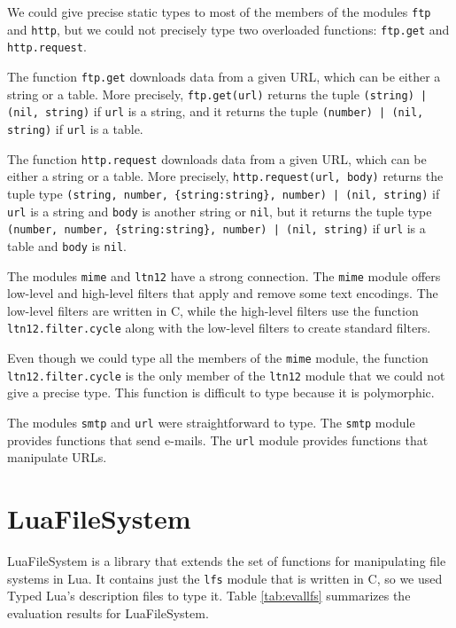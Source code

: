 We could give precise static types to most of the members of the
modules \texttt{ftp} and \texttt{http}, but we could not precisely type
two overloaded functions: \texttt{ftp.get} and \texttt{http.request}.

The function \texttt{ftp.get} downloads data from a given URL,
which can be either a string or a table.
More precisely, \texttt{ftp.get(url)} returns the tuple
\texttt{(string) | (nil, string)} if \texttt{url} is a string,
and it returns the tuple \texttt{(number) | (nil, string)} if
\texttt{url} is a table.

The function \texttt{http.request} downloads data from a given URL,
which can be either a string or a table.
More precisely, \texttt{http.request(url, body)} returns the tuple type
\texttt{(string, number, \{string:string\}, number) | (nil, string)}
if \texttt{url} is a string and \texttt{body} is another string or \texttt{nil},
but it returns the tuple type
\texttt{(number, number, \{string:string\}, number) | (nil, string)}
if \texttt{url} is a table and \texttt{body} is \texttt{nil}.

The modules \texttt{mime} and \texttt{ltn12} have a strong connection.
The \texttt{mime} module offers low-level and high-level filters
that apply and remove some text encodings.
The low-level filters are written in C, while the high-level filters
use the function \texttt{ltn12.filter.cycle} along with the low-level
filters to create standard filters.

Even though we could type all the members of the \texttt{mime} module,
the function \texttt{ltn12.filter.cycle} is the only member of the
\texttt{ltn12} module that we could not give a precise type.
This function is difficult to type because it is polymorphic.

The modules \texttt{smtp} and \texttt{url} were straightforward to type.
The \texttt{smtp} module provides functions that send e-mails.
The \texttt{url} module provides functions that manipulate URLs.

\section{LuaFileSystem}

LuaFileSystem is a library that extends the set of functions
for manipulating file systems in Lua.
It contains just the \texttt{lfs} module that is written in C,
so we used Typed Lua's description files to type it.
Table \ref{tab:evallfs} summarizes the evaluation results for LuaFileSystem.

